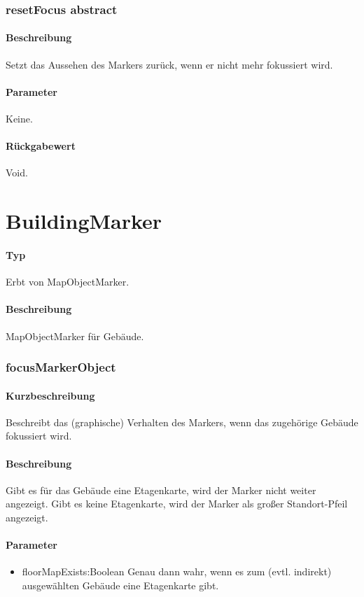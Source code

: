 \subsubsection{resetFocus {abstract}}%
\paragraph*{Beschreibung}
Setzt das Aussehen des Markers zurück, wenn er nicht mehr fokussiert wird.
\paragraph*{Parameter}
Keine.
\paragraph*{Rückgabewert}
Void.


\section{BuildingMarker}
\paragraph*{Typ} 
Erbt von MapObjectMarker.
\paragraph*{Beschreibung}
MapObjectMarker für Gebäude.

\subsubsection{focusMarkerObject}%
\paragraph*{Kurzbeschreibung}
Beschreibt das (graphische) Verhalten des Markers, wenn das zugehörige Gebäude fokussiert wird.
\paragraph*{Beschreibung}
Gibt es für das Gebäude eine Etagenkarte, wird der Marker nicht weiter angezeigt.
Gibt es keine Etagenkarte, wird der Marker als großer Standort-Pfeil angezeigt.
\paragraph*{Parameter}
\begin{itemize}
    \item floorMapExists:Boolean Genau dann wahr, wenn es zum (evtl. indirekt) ausgewählten Gebäude eine Etagenkarte gibt.
\end{itemize}
